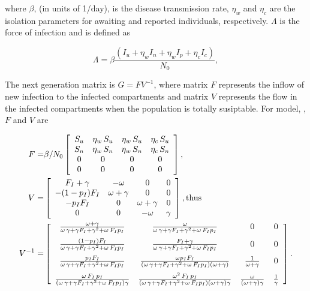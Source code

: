 \documentclass[12pt]{article}
\theoremstyle{definition} %
\begin{document}
where $\beta$, (in units of 1/day), is the disease transmission rate, $\eta_w$ and $\eta_c$ are the isolation parameters for awaiting and reported individuals, respectively. $\Lambda$ is the force of infection and is defined as 

\begin{equation}
\label{Lambda}
\Lambda=\beta \frac{(I_u+\eta_w I_n+\eta_w I_p+ \eta_c I_c)}{N_0},
\end{equation}


The next generation matrix is $G = F V^{-1}$, where matrix $F$ represents the inflow of new infection to the infected compartments and matrix $V$ represents the flow in the infected compartments when the population is totally susiptable. For model, , $F$ and $V$ are

\begin{align}
\label{FV}
F =& \beta/N_0 \left[ \begin {array}{cccc} 
S_u&\eta_w\,S_u&\eta_w\,S_u&\eta_c\,S_u\\
S_n&\eta_w\,S_n&\eta_w\,S_n&\eta_c\,S_n\\ 
0&0&0&0\\
0&0&0&0
 \end {array} \right], \\
  V =&
 \left[ \begin {array}{cccc}  
F_I+\gamma&-\omega&0&0\\
-(1-p_I)F_I&\omega+\gamma&0&0\\
-p_I F_I&0&\omega+\gamma&0\\
0&0&-\omega&\gamma
\end {array} \right], \text{thus}\\
V^{-1} =&
\left[ \begin {array}{cccc}
\frac {\omega+\gamma}{\omega\,\gamma+\gamma F_I+\gamma^2+\omega\, F_I p_I}&\frac {\omega}{\omega\,\gamma+\gamma F_I+\gamma^2+\omega\, F_I p_I}&0&0\\
\noalign{\medskip}
\frac{(1-p_I) F_I}{\omega\,\gamma+\gamma F_I+\gamma^2+\omega\, F_I p_I}&
\frac{F_I+\gamma}{\omega\,\gamma+\gamma F_I+\gamma^2+\omega\, F_I p_I}&0&0\\
\noalign{\medskip}
\frac{p_I F_I}{\omega\,\gamma+\gamma F_I+\gamma^2+\omega\, F_I p_I}&
\frac{\omega p_I F_I}{(\omega\,\gamma+\gamma F_I+\gamma^2+\omega\, F_I p_I)(\omega+\gamma)}& \frac{1}{\omega+\gamma}&0 \\
\noalign{\medskip}
\frac{\omega\,F_I\,p_I}{(\omega\,\gamma+\gamma F_I+\gamma^2+\omega\, F_I p_I) \gamma}& 
\frac{\omega^2\,F_I\,p_I}{(\omega\,\gamma+\gamma F_I+\gamma^2+\omega\, F_I p_I)(\omega+\gamma) \gamma}&
\frac{\omega}{(\omega+\gamma) \gamma}&
\frac{1}{\gamma}
\end {array} \right].
\end{align}
\end{document}
